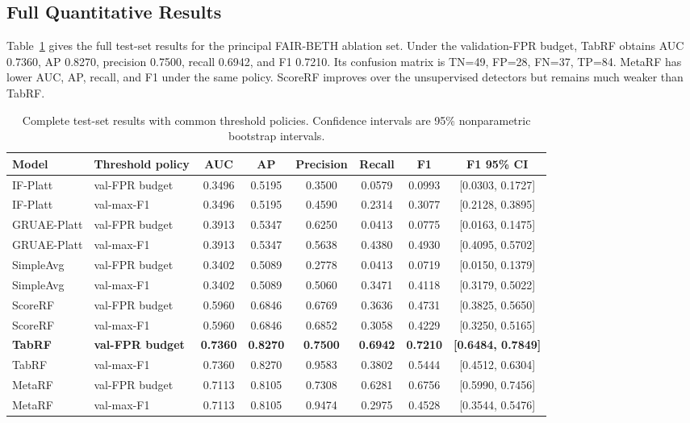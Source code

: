 \documentclass[10pt,journal,compsoc]{IEEEtran}
\begin{document}
\subsection{Full Quantitative Results}

Table~\ref{tab:full_results} gives the full test-set results for the principal FAIR-BETH ablation set. Under the validation-FPR budget, TabRF obtains AUC 0.7360, AP 0.8270, precision 0.7500, recall 0.6942, and F1 0.7210. Its confusion matrix is TN=49, FP=28, FN=37, TP=84. MetaRF has lower AUC, AP, recall, and F1 under the same policy. ScoreRF improves over the unsupervised detectors but remains much weaker than TabRF.

\begin{table}[t]
\centering
\caption{Complete test-set results with common threshold policies. Confidence intervals are 95\% nonparametric bootstrap intervals.}
\label{tab:full_results}
\begin{tabular}{llcccccc}
\toprule
\textbf{Model} & \textbf{Threshold policy} & \textbf{AUC} & \textbf{AP} & \textbf{Precision} & \textbf{Recall} & \textbf{F1} & \textbf{F1 95\% CI} \\
\midrule
IF-Platt & val-FPR budget & 0.3496 & 0.5195 & 0.3500 & 0.0579 & 0.0993 & [0.0303, 0.1727] \\
IF-Platt & val-max-F1 & 0.3496 & 0.5195 & 0.4590 & 0.2314 & 0.3077 & [0.2128, 0.3895] \\
GRUAE-Platt & val-FPR budget & 0.3913 & 0.5347 & 0.6250 & 0.0413 & 0.0775 & [0.0163, 0.1475] \\
GRUAE-Platt & val-max-F1 & 0.3913 & 0.5347 & 0.5638 & 0.4380 & 0.4930 & [0.4095, 0.5702] \\
SimpleAvg & val-FPR budget & 0.3402 & 0.5089 & 0.2778 & 0.0413 & 0.0719 & [0.0150, 0.1379] \\
SimpleAvg & val-max-F1 & 0.3402 & 0.5089 & 0.5060 & 0.3471 & 0.4118 & [0.3179, 0.5022] \\
ScoreRF & val-FPR budget & 0.5960 & 0.6846 & 0.6769 & 0.3636 & 0.4731 & [0.3825, 0.5650] \\
ScoreRF & val-max-F1 & 0.5960 & 0.6846 & 0.6852 & 0.3058 & 0.4229 & [0.3250, 0.5165] \\
\textbf{TabRF} & \textbf{val-FPR budget} & \textbf{0.7360} & \textbf{0.8270} & \textbf{0.7500} & \textbf{0.6942} & \textbf{0.7210} & \textbf{[0.6484, 0.7849]} \\
TabRF & val-max-F1 & 0.7360 & 0.8270 & 0.9583 & 0.3802 & 0.5444 & [0.4512, 0.6304] \\
MetaRF & val-FPR budget & 0.7113 & 0.8105 & 0.7308 & 0.6281 & 0.6756 & [0.5990, 0.7456] \\
MetaRF & val-max-F1 & 0.7113 & 0.8105 & 0.9474 & 0.2975 & 0.4528 & [0.3544, 0.5476] \\
\bottomrule
\end{tabular}
\end{table}
\end{document}
